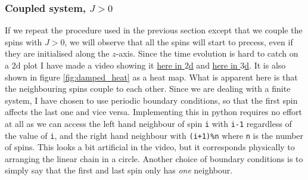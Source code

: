 \subsubsection{Coupled system, $J > 0$}

If we repeat the procedure used in the previous section except that we couple the spins with $J > 0$, we will observe that all the spins will start to precess, even if they are initialised along the $z$-axis. Since the time evolution is hard to catch on a $2\mathrm{d}$ plot I have made a video showing it \href{https://folk.ntnu.no/sondrdl/spinwaves/coupled_spins.mp4}{here in $2$d} and \href{https://folk.ntnu.no/sondrdl/spinwaves/coupled_spins_3d.mp4}{here in $3$d}. It is also shown in figure \ref{fig:damped_heat} as a heat map. What is apparent here is that the neighbouring spins couple to each other. Since we are dealing with a finite system, I have chosen to use periodic boundary conditions, so that the first spin affects the last one and vice versa. Implementing this in python requires no effort at all as we can access the left hand neighbour of spin \texttt{i} with \texttt{i-1} regardless of the value of \texttt{i}, and the right hand neighbour with \texttt{(i+1)\%n} where \texttt{n} is the number of spins. This looks a bit artificial in the video, but it corresponds physically to arranging the linear chain in a circle. Another choice of boundary conditions is to simply say that the first and last spin only has \textit{one} neighbour. 


